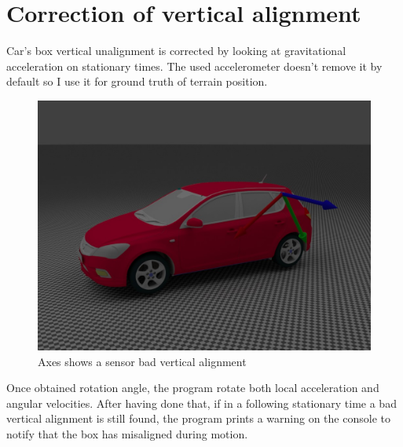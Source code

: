 \section{Correction of vertical alignment}
Car's box vertical unalignment is corrected by looking at gravitational acceleration on stationary times. The used accelerometer doesn't remove it by default so I use it for ground truth of terrain position.
\begin{figure}[H]
\includegraphics[width=\textwidth]{kia_bad_z_align.jpg}
\caption{Axes shows a sensor bad vertical alignment}
\end{figure}

Once obtained rotation angle, the program rotate both local acceleration and angular velocities. After having done that, if in a following stationary time a bad vertical alignment is still found, the program prints a warning on the console to notify that the box has misaligned during motion.

